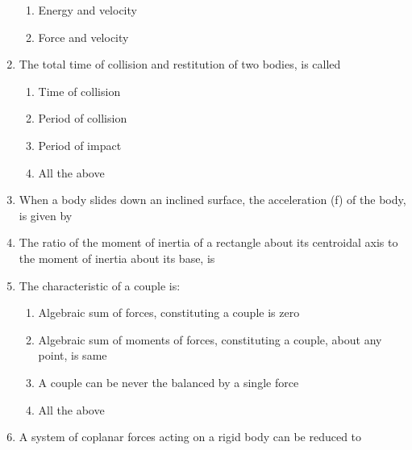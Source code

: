 \documentclass[11pt,a4paper]{article}
\begin{document}
\begin{enumerate}
\begin{enumerate}[label=\Alph*.]
\item{Energy and velocity}
\item{Force and velocity}
\end{enumerate}
\item{The total time of collision and restitution of two bodies, is called}
\begin{enumerate}[label=\Alph*.]
\item{Time of collision}
\item{Period of collision}
\item{Period of impact}
\item{All the above}
\end{enumerate}
\item{When a body slides down an inclined surface, the acceleration (f) of the body, is given by}
\\
\item{The ratio of the moment of inertia of a rectangle about its centroidal axis to the moment of inertia about its base, is}
\\
\item{The characteristic of a couple is:}
\begin{enumerate}[label=\Alph*.]
\item{Algebraic sum of forces, constituting a couple is zero}
\item{Algebraic sum of moments of forces, constituting a couple, about any point, is same}
\item{A couple can be never the balanced by a single force}
\item{All the above}
\end{enumerate}
\item{A system of coplanar forces acting on a rigid body can be reduced to}
\begin{enumerate}[label=\Alph*.]

\end{enumerate}
\end{enumerate}
\end{document}
